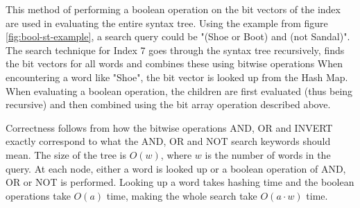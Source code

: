 This method of performing a boolean operation on the bit vectors of the index are used in evaluating the entire syntax tree. Using the example from figure \ref{fig:bool-st-example}, a search query could be "(Shoe or Boot) and (not Sandal)". The search technique for Index 7 goes through the syntax tree recursively, finds the bit vectors for all words and combines these using bitwise operations
When encountering a word like "Shoe", the bit vector is looked up from the Hash Map. When evaluating a boolean operation, the children are first evaluated (thus being recursive) and then combined using the bit array operation described above. 

Correctness follows from how the bitwise operations AND, OR and INVERT exactly correspond to what the AND, OR and NOT search keywords should mean. The size of the tree is $O(w)$, where $w$ is the number of words in the query. At each node, either a word is looked up or a boolean operation of AND, OR or NOT is performed. Looking up a word takes hashing time and the boolean operations take $O(a)$ time, making the whole search take $O(a\cdot w)$ time. 


